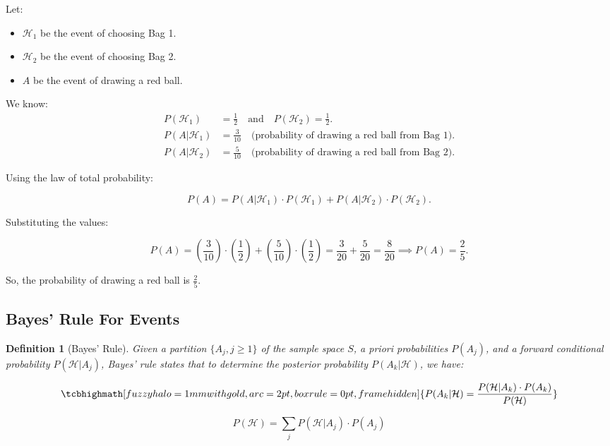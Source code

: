 \documentclass[a4paper,10pt]{article}
\newcommand{\equationgold}[1]{
  \tcbhighmath[fuzzy halo=1mm with gold,arc=2pt,boxrule=0pt,frame hidden]{#1}
}
\newtheorem{definition}{Definition}[section] %
\newcommand{\hlt}[1]{\colorbox{color3}{#1}}
\begin{document}
Let:
\begin{itemize}
    \item $\mathcal{H}_1$ be the event of choosing Bag 1.
    \item $\mathcal{H}_2$ be the event of choosing Bag 2.
    \item $A$ be the event of drawing a red ball.
\end{itemize}

We know:
\begin{align*}
    P(\mathcal{H}_1) &= \frac{1}{2} \quad \text{and} \quad P(\mathcal{H}_2) = \frac{1}{2}. \\
    P(A | \mathcal{H}_1) &= \frac{3}{10} \quad \text{(probability of drawing a red ball from Bag 1)}. \\
    P(A | \mathcal{H}_2) &= \frac{5}{10} \quad \text{(probability of drawing a red ball from Bag 2)}.
\end{align*}

Using the law of total probability:

$$
P(A) = P(A | \mathcal{H}_1) \cdot P(\mathcal{H}_1) + P(A | \mathcal{H}_2) \cdot P(\mathcal{H}_2).
$$

Substituting the values:

$$
P(A) = \left(\frac{3}{10}\right) \cdot \left(\frac{1}{2}\right) + \left(\frac{5}{10}\right) \cdot \left(\frac{1}{2}\right) = \frac{3}{20} + \frac{5}{20} = \frac{8}{20} \implies P(A) = \frac{2}{5}.
$$

So, the probability of drawing a red ball is $ \frac{2}{5} $.

\subsection{Bayes' Rule For Events}

\begin{definition}[Bayes' Rule]
    Given a partition $ \{A_j, j \geq 1\} $ of the sample space $ S $, a \hlt{priori} probabilities $ P(A_j) $, and a forward conditional probability $ P(\mathcal{H} | A_j) $, Bayes' rule states that to determine the \hlt{posterior} probability $ P(A_k | \mathcal{H}) $, we have:

    \begin{equation}
    \equationgold{P(A_k | \mathcal{H}) = \frac{P(\mathcal{H} | A_k) \cdot P(A_k)}{P(\mathcal{H})}}
    \end{equation}
\end{definition}

\begin{equation}
P(\mathcal{H}) = \sum_{j} P(\mathcal{H} | A_j) \cdot P(A_j)
\end{equation}
\end{document}
